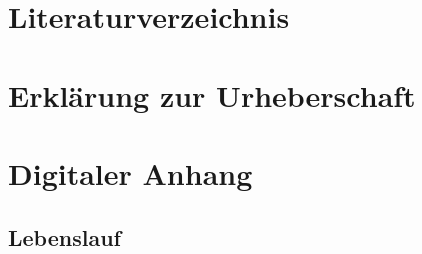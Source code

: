 \documentclass[a4paper,12pt]{article}
\begin{document}
\section{Literaturverzeichnis}


\newpage
\section{Erklärung zur Urheberschaft}


\newpage
\listoffigures


\listoftables %
\newpage
\section{Digitaler Anhang}

\subsection*{Lebenslauf}

\end{document}
